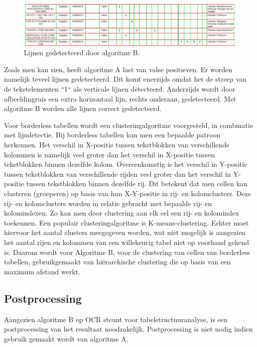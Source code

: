 \begin{figure}[H]
    \centering
    \includegraphics[width=1\textwidth]{img/lines_detected_b.png}
    \caption{Lijnen gedetecteerd door algoritme B.}
    \label{fig:lines-detected-b-overzicht}
\end{figure}

Zoals men kan zien, heeft algoritme A last van valse positieven. Er worden namelijk teveel lijnen gedetecteerd. Dit komt enerzijds omdat het de streep van de tekstelementen ``1`` als verticale lijnen detecteerd. Anderzijds wordt door afbeeldingruis een extra horizontaal lijn, rechts onderaan, gedetecteerd. Met algoritme B worden alle lijnen correct gedetecteerd.

Voor borderless tabellen wordt een clusteringalgoritme voorgesteld, in combinatie met lijndetectie. Bij borderless tabellen kan men een bepaalde patroon herkennen. Het verschil in X-positie tussen tekstblokken van verschillende kolommen is namelijk veel groter dan het verschil in X-positie tussen tekstblokken binnen dezelfde kolom. Overeenkomstig is het verschil in Y-positie tussen tekstblokken van verschillende rijden veel groter dan het verschil in Y-positie tussen tekstblokken binnen dezelfde rij. Dit betekent dat men cellen kan clusteren (groeperen) op basis van hun X-Y-positie in rij- en kolomclusters. Deze rij- en kolomclusters worden in relatie gebracht met bepaalde rij- en kolomindexen. Zo kan men door clustering aan elk cel een rij- en kolomindex toekennen. Een populair clusteringalgoritme is K-means-clustering. Echter moet hiervoor het aantal clusters meegegeven worden, wat niet mogelijk is aangezien het aantal rijen en kolommen van een willekeurig tabel niet op voorhand gekend is. Daarom wordt voor Algoritme B, voor de clustering van cellen van borderless tabellen, gebruikgemaakt van hiërarchische clustering die op basis van een maximum afstand werkt.

\subsection{Postprocessing}
\label{subsec:post-processing}

Aangezien algoritme B op \Gls{OCR} steunt voor tabelstructuuranalyse, is een postprocessing van het resultaat noodzakelijk. Postprocessing is niet nodig indien gebruik gemaakt wordt van algoritme A.

